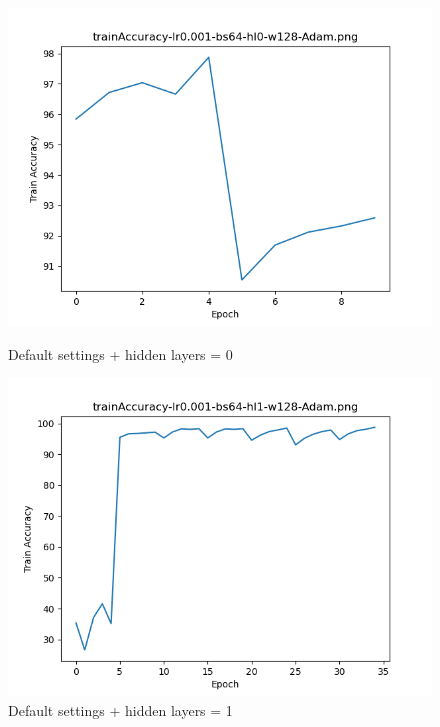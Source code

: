 \documentclass{article}[12pt]
\begin{document}
    \begin{figure}[H]
        \includegraphics[width=\linewidth]{testsResults/trainAccuracy/trainAccuracy-lr0.001-bs64-hl0-w128-Adam.png}
        \caption{Default settings + hidden layers = 0}
        \endminipage\hfill
        \includegraphics[width=\linewidth]{testsResults/trainAccuracy/trainAccuracy-lr0.001-bs64-hl1-w128-Adam.png}
        \caption{Default settings + hidden layers = 1}
        \endminipage
    \end{figure}
\end{document}
